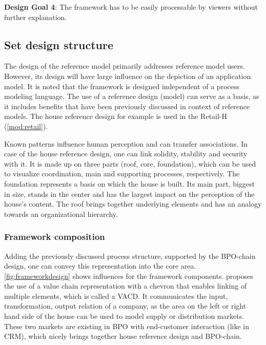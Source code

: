 	\hfill\begin{minipage}{\dimexpr\textwidth-1.2cm}
	\textbf{Design Goal 4}: The framework has to be easily processable by viewers without further explanation. 
\end{minipage}

	\subsection{Set design structure}
	
	The design of the reference model primarily addresses reference model users. However, its design will have large influence on the depiction of an application model. It is noted that the framework is designed independent of a process modeling language. The use of a reference design (model) can serve as a basis, as it includes benefits that have been previously discussed in context of reference models. The house reference design for example is used in the Retail-H (\ref{mod:retail}).
	
	Known patterns influence human perception \citep{kroeber1997} and can transfer associations. In case of the house reference design, one can link solidity, stability and security \citep[]{Meise2001} with it. It is made up on three parts (\viz roof, core, foundation), which can be used to visualize coordination, main and supporting processes, respectively. The foundation represents a basis on which the house is built. Its main part, biggest in size, stands in the center and has the largest impact on the perception of the house's content. The roof brings together underlying elements and has an analogy towards an organizational hierarchy. 
	
	\subsubsection{Framework composition}
	
	Adding the previously discussed process structure, supported by the BPO-chain design, one can convey this representation into the core area. \Fig \ref{fig:frameworkdesign} shows influences for the framework components. 
	\citeauthor{Meise2001} proposes the use of a value chain representation with a chevron that enables linking of multiple elements, which is called a \acrfull{VACD}. It communicates the input, transformation, output relation of a company, as the area on the left or right hand side of the house can be used to model supply or distribution markets. 
	These two markets are existing in BPO with end-customer interaction (like in \acrshort{CRM}), which nicely brings together house reference design and \acrshort{BPO}-chain. 
	

